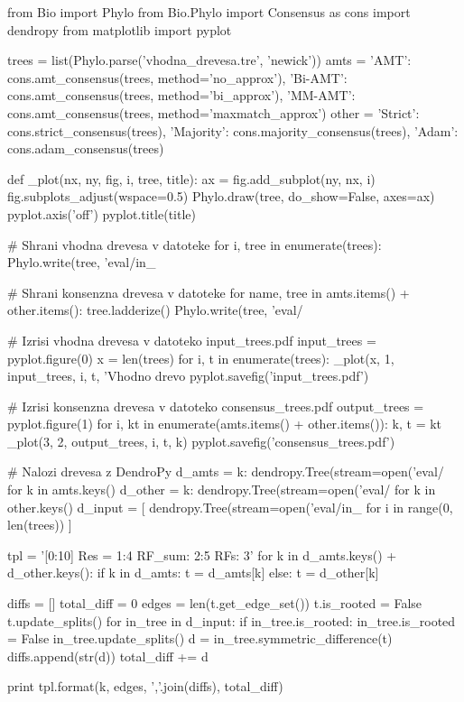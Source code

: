 \documentclass[a4paper, 12pt]{book}
\begin{document}
\begin{python}
from Bio import Phylo
from Bio.Phylo import Consensus as cons
import dendropy
from matplotlib import pyplot

trees = list(Phylo.parse('vhodna_drevesa.tre', 'newick'))
amts = {
    'AMT': cons.amt_consensus(trees, method='no_approx'),
    'Bi-AMT': cons.amt_consensus(trees, method='bi_approx'),
    'MM-AMT': cons.amt_consensus(trees, method='maxmatch_approx')
}
other = {
    'Strict': cons.strict_consensus(trees),
    'Majority': cons.majority_consensus(trees),
    'Adam': cons.adam_consensus(trees)
}

def _plot(nx, ny, fig, i, tree, title):
    ax = fig.add_subplot(ny, nx, i)
    fig.subplots_adjust(wspace=0.5)
    Phylo.draw(tree, do_show=False, axes=ax)
    pyplot.axis('off')
    pyplot.title(title)

# Shrani vhodna drevesa v datoteke
for i, tree in enumerate(trees):
    Phylo.write(tree, 'eval/in_%

# Shrani konsenzna drevesa v datoteke
for name, tree in amts.items() + other.items():
    tree.ladderize()
    Phylo.write(tree, 'eval/%

# Izrisi vhodna drevesa v datoteko input_trees.pdf
input_trees = pyplot.figure(0)
x = len(trees)
for i, t in enumerate(trees):
    _plot(x, 1, input_trees, i, t, 'Vhodno drevo %
pyplot.savefig('input_trees.pdf')

# Izrisi konsenzna drevesa v datoteko consensus_trees.pdf
output_trees = pyplot.figure(1)
for i, kt in enumerate(amts.items() + other.items()):
    k, t = kt
    _plot(3, 2, output_trees, i, t, k)
pyplot.savefig('consensus_trees.pdf')

# Nalozi drevesa z DendroPy
d_amts = {
    k: dendropy.Tree(stream=open('eval/%
    for k in amts.keys()
}
d_other = {
    k: dendropy.Tree(stream=open('eval/%
    for k in other.keys()
}
d_input = [
    dendropy.Tree(stream=open('eval/in_%
    for i in range(0, len(trees))
]

tpl = '[{0:10}] Res = {1:4} RF_sum: {2:5} RFs: {3}'
for k in d_amts.keys() + d_other.keys():
    if k in d_amts:
        t = d_amts[k]
    else:
        t = d_other[k]

    diffs = []
    total_diff = 0
    edges = len(t.get_edge_set())
    t.is_rooted = False
    t.update_splits()
    for in_tree in d_input:
        if in_tree.is_rooted:
            in_tree.is_rooted = False
            in_tree.update_splits()
        d = in_tree.symmetric_difference(t)
        diffs.append(str(d))
        total_diff += d

    print tpl.format(k, edges, ','.join(diffs), total_diff)
\end{python}
\end{document}
